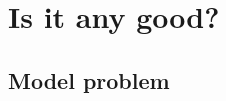 \documentclass[@BEAMER_OPTIONS@]{beamer}
\begin{document}
\section{Is it any good?}

\begin{frame}{}
\end{frame}

\note{ }

\subsection{Model problem}

\end{document}
